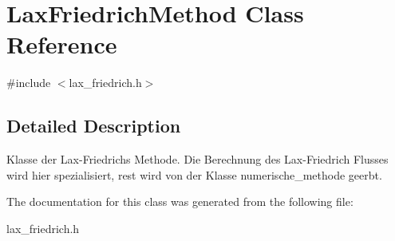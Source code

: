 \hypertarget{classLaxFriedrichMethod}{\section{Lax\-Friedrich\-Method Class Reference}
\label{classLaxFriedrichMethod}
}


{\ttfamily \#include $<$lax\-\_\-friedrich.\-h$>$}



\subsection{Detailed Description}
Klasse der Lax-\/\-Friedrichs Methode. Die Berechnung des Lax-\/\-Friedrich Flusses wird hier spezialisiert, rest wird von der Klasse numerische\-\_\-methode geerbt. 

The documentation for this class was generated from the following file\-:\begin{DoxyCompactItemize}
\item 
lax\-\_\-friedrich.\-h\end{DoxyCompactItemize}
